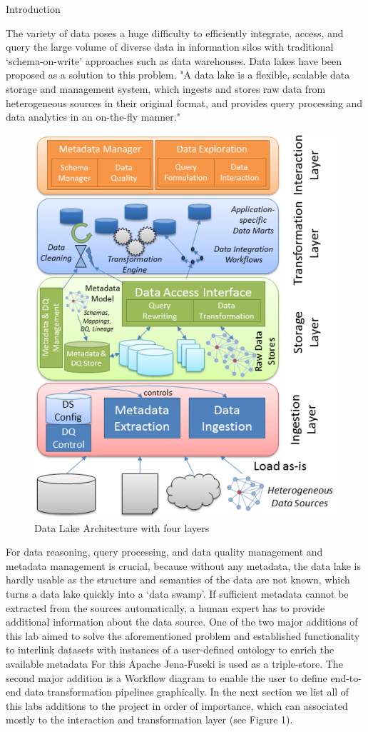 \documentclass[12pt]{beamer}
\begin{document}
\begin{textblock}{0.5}
\begin{block}{Introduction}
\item The variety of data poses a huge difficulty to efficiently integrate, access, and query the large volume of diverse data in information silos with traditional ‘schema-on-write’ approaches such as data warehouses. Data lakes have been proposed as a solution to this problem. "A data lake is a flexible, scalable data storage and management system, which ingests and stores raw data from heterogeneous sources in their original format, and provides query processing and data analytics in an on-the-fly manner." \cite{1}
\begin{figure}[H]
	\includegraphics[width=0.7\linewidth]{data_lake_architecture.PNG}
	\caption{Data Lake Architecture with four layers \cite{2}} \label{Figure 1}
\end{figure}
For data reasoning, query processing, and data quality management and metadata management is crucial, because without any metadata, the data lake is hardly usable as the structure and semantics of the data are not known, which turns a data lake quickly into a ‘data swamp’. If sufficient metadata cannot be extracted from the sources automatically, a human expert has to provide additional information about the data source. \cite{1} One of the two major additions of this lab aimed to solve the aforementioned problem and established functionality to interlink datasets with instances of a user-defined ontology to enrich the available metadata For this Apache Jena-Fuseki is used as a triple-store. The second major addition is a Workflow diagram to enable the user to define end-to-end data transformation pipelines graphically. In the next section we list all of this labs additions to the project in order of importance, which can associated mostly to the interaction and transformation layer (see Figure 1).
\end{block}


\end{textblock}
\end{document}
